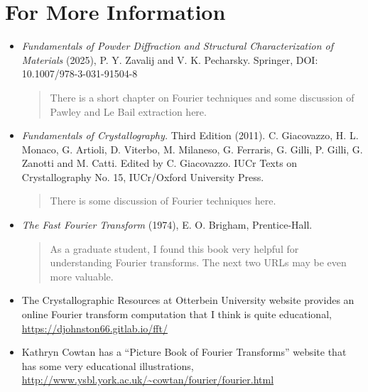 \section{For More Information}

\begin{itemize}
\item\textit{Fundamentals of Powder Diffraction and Structural Characterization of Materials} (2025), P. Y. Zavalij and V. K. Pecharsky. Springer, DOI: 10.1007/978-3-031-91504-8
\begin{quote}
There is a short chapter on Fourier techniques and some discussion of Pawley and Le Bail extraction here.
\end{quote}

\item\textit{Fundamentals of Crystallography.} Third Edition (2011). C. Giacovazzo, H. L. Monaco, G. Artioli, D. Viterbo, M. Milaneso, G. Ferraris, G. Gilli, P. Gilli, G. Zanotti and M. Catti. Edited by C. Giacovazzo. IUCr Texts on Crystallography No. 15, IUCr/Oxford University Press.
\begin{quote}
There is some discussion of Fourier techniques here.
\end{quote}

\item 
\textit{The Fast Fourier Transform} (1974), E. O. Brigham, Prentice-Hall. 
\begin{quote}
As a graduate student, I found this book very helpful for understanding Fourier transforms. The next two URLs may be even more valuable.
\end{quote}

\item
The Crystallographic Resources at Otterbein University website provides an online Fourier transform computation that I think is quite educational, 
\url{https://djohnston66.gitlab.io/fft/}

\item
Kathryn Cowtan has a ``Picture Book of Fourier Transforms'' website that has some very educational illustrations, \url{http://www.ysbl.york.ac.uk/~cowtan/fourier/fourier.html}

\end{itemize}
